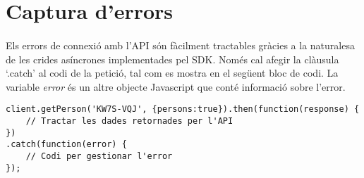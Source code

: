 \section{Captura d'errors}

    \paragraph{}
    Els errors de connexió amb l’API són fàcilment tractables gràcies a la naturalesa de les crides asíncrones implementades pel SDK. Només cal afegir la clàusula `.catch' al codi de la petició, tal com es mostra en el següent bloc de codi. La variable \emph{error} és un altre objecte Javascript que conté informació sobre l’error.

\begin{lstlisting}[style=rawOwn,caption={Tractament d'errors amb l'objecte \emph{error}}]
client.getPerson('KW7S-VQJ', {persons:true}).then(function(response) {
    // Tractar les dades retornades per l'API
})
.catch(function(error) {
    // Codi per gestionar l'error
});

\end{lstlisting}
